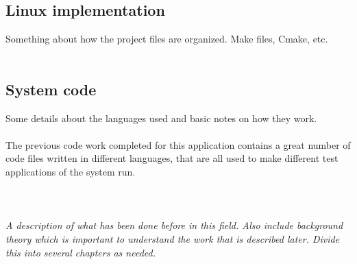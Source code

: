 \subsection{Linux implementation}
Something about how the project files are organized. Make files, Cmake, etc. \\\\

\subsection{System code}
Some details about the languages used and basic notes on how they work. 
\\\\
\noindent
The previous code work completed for this application contains a great number of code files written in different languages, that are all used to make different test applications of the system run. %
\\\\\\
\noindent
\textit{\color{red}\\
A description of what has been done before in this field. Also include background theory which is important to understand the work that is described later. Divide this into several chapters as needed. }\\
\clearpage




























